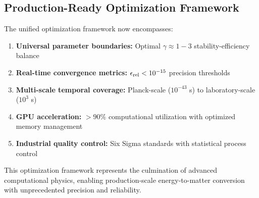 \documentclass[12pt]{article}
\begin{document}
\subsection{Production-Ready Optimization Framework}
The unified optimization framework now encompasses:

\begin{enumerate}
  \item \textbf{Universal parameter boundaries:} Optimal $\gamma \approx 1-3$ stability-efficiency balance
  \item \textbf{Real-time convergence metrics:} $\epsilon_{\rm rel} < 10^{-15}$ precision thresholds
  \item \textbf{Multi-scale temporal coverage:} Planck-scale ($10^{-43}$ s) to laboratory-scale ($10^3$ s)
  \item \textbf{GPU acceleration:} $>90\%$ computational utilization with optimized memory management
  \item \textbf{Industrial quality control:} Six Sigma standards with statistical process control
\end{enumerate}

This optimization framework represents the culmination of advanced computational physics, enabling production-scale energy-to-matter conversion with unprecedented precision and reliability.
\end{document}
